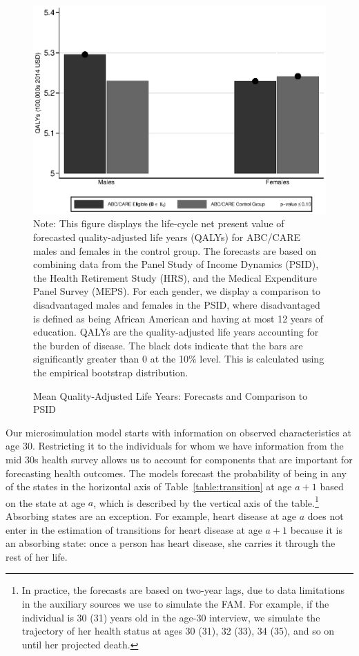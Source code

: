 \begin{figure}[!htbp]
\caption{Mean Quality-Adjusted Life Years: Forecasts and Comparison to PSID}\label{fig:qalys}
\centering
\includegraphics[width=.7\columnwidth]{output/qalyexppsid.eps}
\footnotesize \justify
Note:  This figure displays the life-cycle net present value of forecasted quality-adjusted life years (QALYs) for ABC/CARE males and females in the control group. The forecasts are based on combining data from the Panel Study of Income Dynamics (PSID), the Health Retirement Study (HRS), and the Medical Expenditure Panel Survey (MEPS). For each gender, we display a comparison to disadvantaged males and females in the PSID, where disadvantaged is defined as being African American and having at most 12 years of education. QALYs are the quality-adjusted life years accounting for the burden of disease. The black dots indicate that the bars are significantly greater than 0 at the 10\% level. This is calculated using the empirical bootstrap distribution.
\end{figure}

Our microsimulation model starts with information on observed characteristics at age 30. Restricting it to the individuals for whom we have information from the mid 30s health survey allows us to account for components that are important for forecasting health outcomes. The models forecast the probability of being in any of the states in the horizontal axis of Table~\ref{table:transition} at age $a+1$ based on the state at age $a$, which is described by the vertical axis of the table.\footnote{In practice, the forecasts are based on two-year lags, due to data limitations in the auxiliary sources we use to simulate the FAM. For example, if the individual is 30 (31) years old in the age-30 interview, we simulate the trajectory of her health status at ages 30 (31), 32 (33), 34 (35), and so on until her projected death.} Absorbing states are an exception. For example, heart disease at age $a$ does not enter in the estimation of transitions for heart disease at age $a+1$ because it is an absorbing state: once a person has heart disease, she carries it through the rest of her life.

